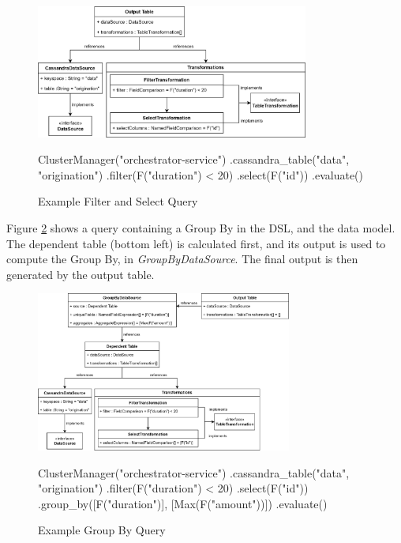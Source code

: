 \begin{figure}[htp]
	\centering
	\includegraphics[width=0.8\textwidth]{chapters/diagrams/implementation/filter-select-query}
	\begin{python}
ClusterManager("orchestrator-service")
.cassandra_table("data", "origination")
.filter(F("duration") < 20)
.select(F("id"))
.evaluate()
	\end{python}
	\caption{Example Filter and Select Query}
	\label{fig:filter-select-query}
\end{figure}

\pagebreak
Figure \ref{fig:group-by-query} shows a query containing a Group By in the DSL, and the data model. The dependent table (bottom left) is calculated first, and its output is used to compute the Group By, in \textit{GroupByDataSource}. The final output is then generated by the output table.

\begin{figure}[htp]
	\centering
	\includegraphics[width=0.75\textwidth]{chapters/diagrams/implementation/group-by-query}
	\linebreak
	\begin{python}
ClusterManager("orchestrator-service")
.cassandra_table("data", "origination")
.filter(F("duration") < 20)
.select(F("id"))
.group_by([F("duration")], [Max(F("amount"))])
.evaluate()
	\end{python}
	\caption{Example Group By Query}
	\label{fig:group-by-query}
\end{figure}

